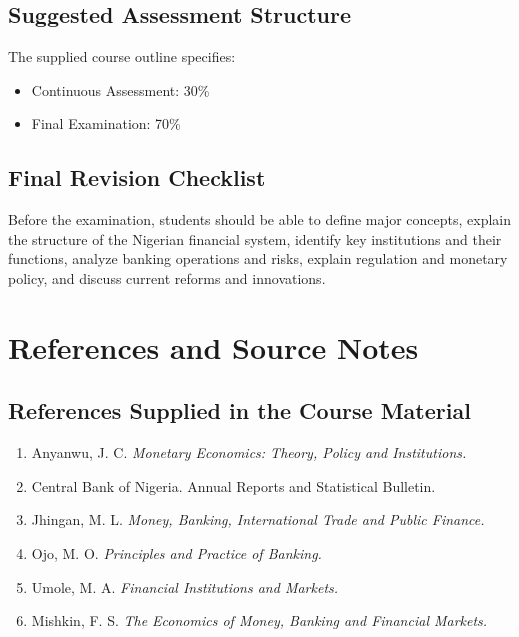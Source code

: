 \documentclass[
]{article}
\providecommand{\tightlist}{%
  \setlength{\itemsep}{0pt}\setlength{\parskip}{0pt}}
\begin{document}
\subsection{Suggested Assessment Structure}\label{suggested-assessment-structure}

The supplied course outline specifies:

\begin{itemize}
\tightlist
\item
  Continuous Assessment: 30\%
\item
  Final Examination: 70\%
\end{itemize}

\subsection{Final Revision Checklist}\label{final-revision-checklist}

Before the examination, students should be able to define major concepts, explain the structure of the Nigerian financial system, identify key institutions and their functions, analyze banking operations and risks, explain regulation and monetary policy, and discuss current reforms and innovations.

\section{References and Source Notes}\label{references-and-source-notes}

\subsection{References Supplied in the Course Material}\label{references-supplied-in-the-course-material}

\begin{enumerate}
\def\labelenumi{\arabic{enumi}.}
\tightlist
\item
  Anyanwu, J. C. \emph{Monetary Economics: Theory, Policy and Institutions.}
\item
  Central Bank of Nigeria. Annual Reports and Statistical Bulletin.
\item
  Jhingan, M. L. \emph{Money, Banking, International Trade and Public Finance.}
\item
  Ojo, M. O. \emph{Principles and Practice of Banking.}
\item
  Umole, M. A. \emph{Financial Institutions and Markets.}
\item
  Mishkin, F. S. \emph{The Economics of Money, Banking and Financial Markets.}
\end{enumerate}
\end{document}
